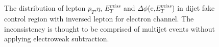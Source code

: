 \begin{figure}[ht]
       \centering
       \\ 
       \\
       \caption{The distribution of lepton $p_{T}$,$\eta$, $E_{T}^{miss}$ and $\Delta\phi$(e,$E_{T}^{miss}$) in dijet fake control region with inversed lepton for electron channel. The inconsistency is thought to be comprised of multijet events without applying electroweak subtraction.} 
       \label{fig:dijetFakeCR_el}
\end{figure}

